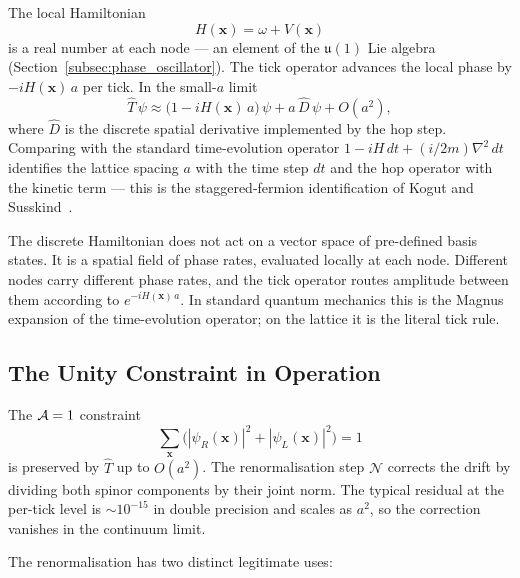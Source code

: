 The local Hamiltonian
\begin{equation}
    H(\mathbf{x}) = \omega + V(\mathbf{x})
    \label{eq:local_hamiltonian}
\end{equation}
is a real number at each node --- an element of the $\mathfrak{u}(1)$
Lie algebra (Section~\ref{subsec:phase_oscillator}). The tick
operator advances the local phase by $-iH(\mathbf{x})\,a$ per tick.
In the small-$a$ limit
\begin{equation}
    \hat{T}\,\psi \approx
        \bigl(1 - iH(\mathbf{x})\,a\bigr)\,\psi
        + a\,\hat{D}\,\psi
        + O(a^2),
    \label{eq:tick_smalla}
\end{equation}
where $\hat{D}$ is the discrete spatial derivative implemented by the
hop step. Comparing with the standard time-evolution operator
$1 - iH\,dt + (i/2m)\nabla^2\,dt$ identifies the lattice spacing $a$
with the time step $dt$ and the hop operator with the kinetic term
--- this is the staggered-fermion identification of
Kogut and Susskind~\cite{kogutsusskind1975}.

The discrete Hamiltonian does not act on a vector space of
pre-defined basis states. It is a spatial field of phase rates,
evaluated locally at each node. Different nodes carry different
phase rates, and the tick operator routes amplitude between them
according to $e^{-iH(\mathbf{x})\,a}$. In standard quantum mechanics
this is the Magnus expansion of the time-evolution operator; on the
lattice it is the literal tick rule.

\subsection{The Unity Constraint in Operation}
\label{subsec:unity_in_operation}

The $\mathcal{A}=1$ constraint
\begin{equation}
    \sum_{\mathbf{x}} \bigl(|\psi_R(\mathbf{x})|^2
                             + |\psi_L(\mathbf{x})|^2\bigr) = 1
    \label{eq:unity_propagation}
\end{equation}
is preserved by $\hat{T}$ up to $O(a^2)$. The renormalisation step
$\mathcal{N}$ corrects the drift by dividing both spinor components
by their joint norm. The typical residual at the per-tick level is
$\sim 10^{-15}$ in double precision and scales as $a^2$, so the
correction vanishes in the continuum limit.

The renormalisation has two distinct legitimate uses:

